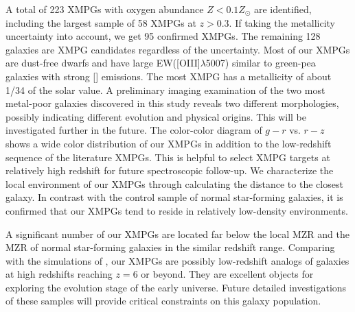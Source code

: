 \documentclass[twocolumn]{aastex631}
\newcommand{\OIII}{[\mbox{\ion{O}{3}}]}   %
\newcommand{\OIIIFOT}{[\mbox{\ion{O}{3}}]$\lambda$4363}
\newcommand{\Zsun}{\mbox{$Z_{\odot}$}}
\begin{document}
A total of 223 XMPGs with oxygen abundance $Z < 0.1\Zsun$ are identified, including the largest sample of 58 XMPGs at $z>0.3$. If taking the metallicity uncertainty into account, we get 95 confirmed XMPGs. The remaining 128 galaxies are XMPG candidates regardless of the uncertainty. Most of our XMPGs are dust-free dwarfs and have large EW([OIII]$\lambda$5007) similar to green-pea galaxies with strong {\OIII} emissions. The most XMPG has a metallicity of about 1/34 of the solar value. A preliminary imaging examination of the two most metal-poor galaxies discovered in this study reveals two different morphologies, possibly indicating different evolution and physical origins. This will be investigated further in the future. The color-color diagram of $g-r$ vs. $r-z$ shows a wide color distribution of our XMPGs in addition to the low-redshift sequence of the literature XMPGs. This is helpful to select XMPG targets at relatively high redshift for future spectroscopic follow-up. We characterize the local environment of our XMPGs through calculating the distance to the closest galaxy. In contrast with the control sample of normal star-forming galaxies, it is confirmed that our XMPGs tend to reside in relatively low-density environments.

A significant number of our XMPGs are located far below the local MZR and the MZR of normal star-forming galaxies in the similar redshift range. Comparing with the simulations of \citet{MaX16}, our XMPGs are possibly low-redshift analogs of galaxies at high redshifts reaching $z=6$ or beyond. They are excellent objects for exploring the evolution stage of the early universe. Future detailed investigations of these samples will provide critical constraints on this galaxy population.  

\end{document}
